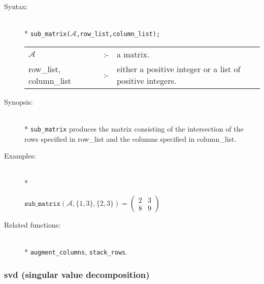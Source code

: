 \begin{description}
\item[Syntax:]\mbox{}\\*
\texttt{sub\_matrix($\mathcal{A}$,row\_list,column\_list);}\\[2mm]
\begin{tabular}{l l p{.605\linewidth}} 
$\mathcal{A}$              &:-& a matrix. \\
row\_list, column\_list &:-& either a 
positive integer or a list of positive integers.
\end{tabular}

\item[Synopsis:]\mbox{}\\*
\texttt{sub\_matrix} produces the matrix consisting of the
              intersection of the rows specified in row\_list and the 
columns specified in column\_list. 

\item[Examples:]\mbox{}\\*
\begin{flushleft}  
\begin{math}  
\texttt{sub\_matrix}(\mathcal{A},\{1,3\},\{2,3\}) =
        \begin{pmatrix} 2 & 3 \\ 8 & 9 \end{pmatrix}
\end{math}  
\end{flushleft}

\item[Related functions:]\mbox{}\\*
\texttt{augment\_columns}, \texttt{stack\_rows}.
\end{description}


\subsubsection{svd (singular value decomposition)}
\label{linalg:svd}

